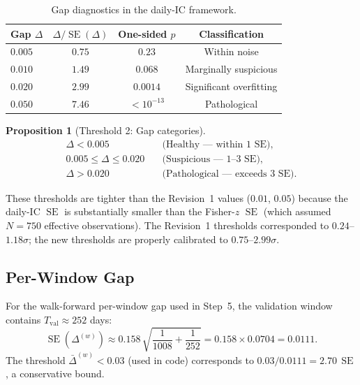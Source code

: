 \documentclass[11pt,a4paper]{article}
\theoremstyle{definition}
\newtheorem{proposition}{Proposition}[section]
\newcommand{\SE}{\operatorname{SE}}
\begin{document}
\begin{table}[htbp]
\centering
\caption{Gap diagnostics in the daily-IC framework.}
\label{tab:gap_v2}
\begin{tabular}{lccc}
\toprule
Gap $\Delta$ & $\Delta/\SE(\Delta)$ & One-sided $p$ & Classification \\
\midrule
$0.005$ & $0.75$ & $0.23$ & Within noise \\
$0.010$ & $1.49$ & $0.068$ & Marginally suspicious \\
$0.020$ & $2.99$ & $0.0014$ & Significant overfitting \\
$0.050$ & $7.46$ & $<10^{-13}$ & Pathological \\
\bottomrule
\end{tabular}
\end{table}

\begin{proposition}[Threshold 2: Gap categories]
\label{prop:thresh2}
\begin{align}
    \boxed{\Delta < 0.005} &\quad\text{(Healthy --- within 1 SE)}, \\
    \boxed{0.005 \leq \Delta \leq 0.020} &\quad\text{(Suspicious --- 1--3 SE)}, \\
    \boxed{\Delta > 0.020} &\quad\text{(Pathological --- exceeds 3 SE)}.
\end{align}
\end{proposition}

These thresholds are tighter than the Revision~1 values ($0.01$,
$0.05$) because the daily-IC $\SE$ is substantially smaller than the
Fisher-$z$ $\SE$ (which assumed $N=750$ effective observations). The
Revision~1 thresholds corresponded to $0.24$--$1.18\sigma$; the new
thresholds are properly calibrated to $0.75$--$2.99\sigma$.

\subsection{Per-Window Gap}

For the walk-forward per-window gap used in Step~5, the validation
window contains $T_{\text{val}} \approx 252$ days:
\begin{equation}
    \SE(\Delta^{(w)}) \approx 0.158\,
    \sqrt{\frac{1}{1008} + \frac{1}{252}}
    = 0.158 \times 0.0704 = 0.0111.
\end{equation}
The threshold $\bar{\Delta}^{(w)} < 0.03$ (used in code) corresponds
to $0.03/0.0111 = 2.70\,\SE$, a conservative bound.

\end{document}

